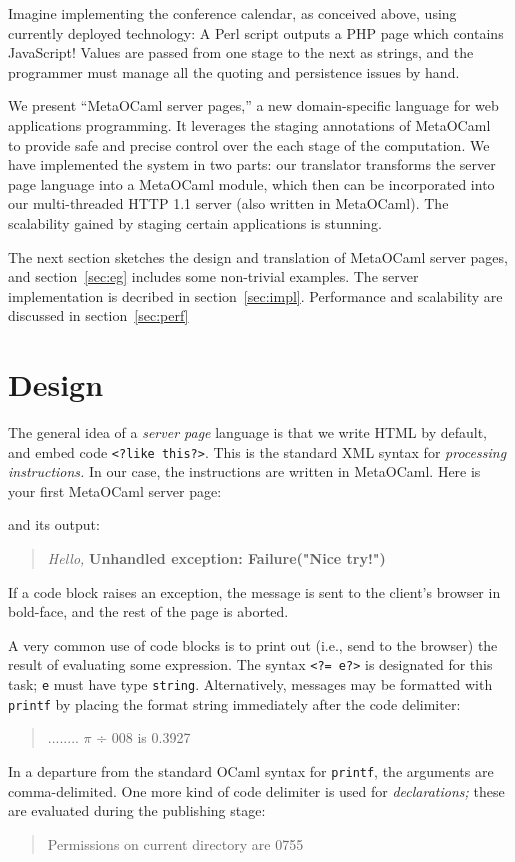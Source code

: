 \documentclass[preprint]{acm_proc_article-sp}
\def\MOC{MetaOCaml}
\begin{document}
Imagine implementing the conference calendar, as conceived
above, using currently deployed technology: A Perl script
outputs a PHP page which contains JavaScript!  Values are
passed from one stage to the next as strings, and the
programmer must manage all the quoting and persistence
issues by hand.

We present ``\MOC{} server pages,'' a new domain-specific
language for web applications programming.  It leverages the
staging annotations of \MOC~\cite{calcagno03meta,taha00metaml}
to provide safe and precise control over the each stage of the
computation.  We have implemented the system in two parts: our
translator transforms the server page language into a \MOC{}
module, which then can be incorporated into our multi-threaded
HTTP 1.1 server (also written in \MOC{}).  The scalability
gained by staging certain applications is stunning.

The next section sketches the design and translation of \MOC{}
server pages, and section~\ref{sec:eg} includes some non-trivial
examples.  The server implementation is decribed in
section~\ref{sec:impl}.  Performance and scalability are
discussed in section~\ref{sec:perf}

\section{Design}
\label{sec:design}

The general idea of a \emph{server page} language is that we
  write HTML by default, and embed code %
\lstinline{<?like this?>}.  %
This is the standard XML syntax for \emph{processing
instructions.}  In our case, the instructions are written in
\MOC{}.   Here is your first \MOC{} server page:


and its output:
\begin{quote}
  \textit{Hello,} \textbf{Unhandled exception: Failure("Nice try!")}
\end{quote}
If a code block raises an exception, the message is sent to the
client's browser in bold-face, and the rest of the page is
aborted. 

\def\cd#1{\lstinline{#1}}
\def\id#1{\texttt{#1}}

A very common use of code blocks is to print out (i.e., send to
the browser) the result of evaluating some expression.  The
syntax \cd{<?= e?>} is designated for this task; \cd{e} must
have type \id{string}.  Alternatively, messages may be formatted
with \id{printf} by placing the format string immediately after
the code delimiter: 
\begin{quote}
  ........ $\pi$ ÷ 008 is 0.3927
\end{quote}
In a departure from the standard OCaml syntax for \id{printf}, the
arguments are comma-delimited.
One more kind of code delimiter is used for \emph{declarations;}
these are evaluated during the publishing stage:

\begin{quote}
Permissions on current directory are 0755
\end{quote}
\end{document}
